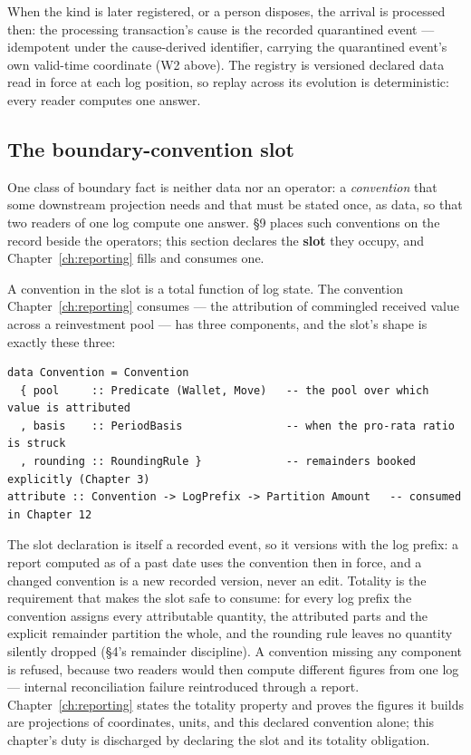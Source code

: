 \documentclass[11pt,a4paper]{article}
\begin{document}
When the kind is later registered, or a person disposes, the arrival is processed then: the
processing transaction's cause is the recorded quarantined event --- idempotent under the
cause-derived identifier, carrying the quarantined event's own valid-time coordinate (W2
above). The registry is versioned declared data read in force at each log position, so
replay across its evolution is deterministic: every reader computes one answer.

\subsection{The boundary-convention slot}\label{sec:slot}

One class of boundary fact is neither data nor an operator: a \emph{convention} that
some downstream projection needs and that must be stated once, as data, so that two readers
of one log compute one answer. \S 9 places such conventions on the record beside the
operators; this section declares the \textbf{slot} they occupy, and
Chapter~\ref{ch:reporting} fills and consumes one.

A convention in the slot is a total function of log state. The convention
Chapter~\ref{ch:reporting} consumes --- the attribution of commingled received value across
a reinvestment pool --- has three components, and the slot's shape is exactly these three:

\begin{lstlisting}
data Convention = Convention
  { pool     :: Predicate (Wallet, Move)   -- the pool over which value is attributed
  , basis    :: PeriodBasis                -- when the pro-rata ratio is struck
  , rounding :: RoundingRule }             -- remainders booked explicitly (Chapter 3)
attribute :: Convention -> LogPrefix -> Partition Amount   -- consumed in Chapter 12
\end{lstlisting}

The slot declaration is itself a recorded event, so it versions with the log prefix: a
report computed as of a past date uses the convention then in force, and a changed
convention is a new recorded version, never an edit. Totality is the requirement that makes
the slot safe to consume: for every log prefix the convention assigns every attributable
quantity, the attributed parts and the explicit remainder partition the whole, and the
rounding rule leaves no quantity silently dropped (\S 4's remainder discipline). A
convention missing any component is refused, because two readers would then compute
different figures from one log --- internal reconciliation failure reintroduced through a
report. Chapter~\ref{ch:reporting} states the totality property and proves the figures it
builds are projections of coordinates, units, and this declared convention alone; this
chapter's duty is discharged by declaring the slot and its totality obligation.
\end{document}
